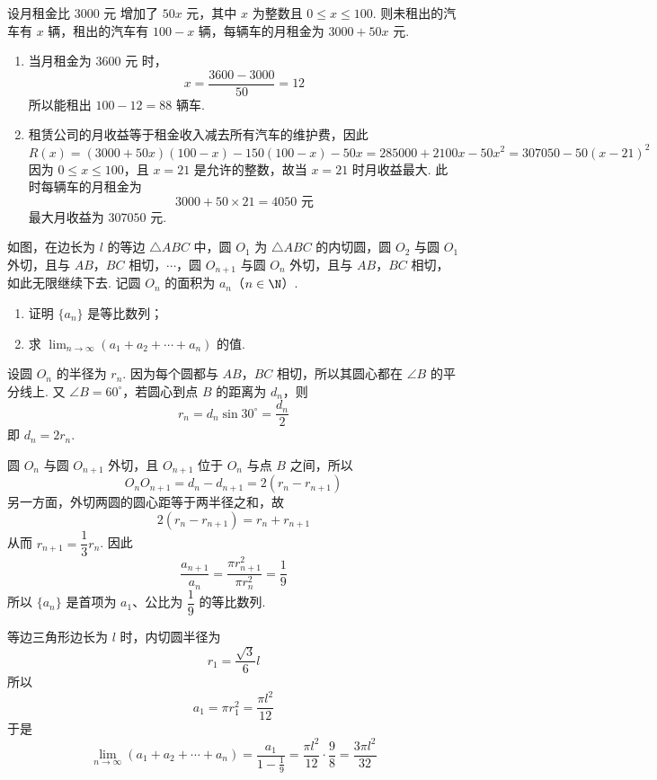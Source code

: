 \begin{solution}
设月租金比 \(3000\text{ 元}\) 增加了 \(50x\text{ 元}\)，其中 \(x\) 为整数且 \(0\leqslant x\leqslant100\). 则未租出的汽车有 \(x\) 辆，租出的汽车有 \(100-x\) 辆，每辆车的月租金为 \(3000+50x\text{ 元}\).

\begin{enumerate}
\item 当月租金为 \(3600\text{ 元}\) 时，
\[
x=\dfrac{3600-3000}{50}=12
\]
所以能租出 \(100-12=88\) 辆车.

\item 租赁公司的月收益等于租金收入减去所有汽车的维护费，因此
\[
R(x)=(3000+50x)(100-x)-150(100-x)-50x
=285000+2100x-50x^2
=307050-50(x-21)^2
\]
因为 \(0\leqslant x\leqslant100\)，且 \(x=21\) 是允许的整数，故当 \(x=21\) 时月收益最大. 此时每辆车的月租金为
\[
3000+50\times21=4050\text{ 元}
\]
最大月收益为 \(307050\text{ 元}\).
\end{enumerate}
\end{solution}

\begin{problem}
如图，在边长为 \(l\) 的等边 \(\triangle ABC\) 中，圆 \(O_{1}\) 为 \(\triangle ABC\) 的内切圆，圆 \(O_{2}\) 与圆 \(O_{1}\) 外切，且与 \(AB\)，\(BC\) 相切，\(\cdots\)，圆 \(O_{n+1}\) 与圆 \(O_{n}\) 外切，且与 \(AB\)，\(BC\) 相切，如此无限继续下去. 记圆 \(O_{n}\) 的面积为 \(a_{n}\)（\(n\in\N\)）.

\begin{enumerate}
\item 证明 \(\{a_{n}\}\) 是等比数列；
\item 求 \(\displaystyle\lim_{n\to\infty}(a_{1}+a_{2}+\cdots+a_{n})\) 的值.
\end{enumerate}

\end{problem}

\begin{solution}
设圆 \(O_n\) 的半径为 \(r_n\). 因为每个圆都与 \(AB\)，\(BC\) 相切，所以其圆心都在 \(\angle B\) 的平分线上. 又 \(\angle B=60^{\circ}\)，若圆心到点 \(B\) 的距离为 \(d_n\)，则
\[
r_n=d_n\sin30^{\circ}=\dfrac{d_n}{2}
\]
即 \(d_n=2r_n\).

圆 \(O_n\) 与圆 \(O_{n+1}\) 外切，且 \(O_{n+1}\) 位于 \(O_n\) 与点 \(B\) 之间，所以
\[
O_nO_{n+1}=d_n-d_{n+1}=2(r_n-r_{n+1})
\]
另一方面，外切两圆的圆心距等于两半径之和，故
\[
2(r_n-r_{n+1})=r_n+r_{n+1}
\]
从而 \(r_{n+1}=\dfrac13r_n\). 因此
\[
\dfrac{a_{n+1}}{a_n}=\dfrac{\pi r_{n+1}^2}{\pi r_n^2}=\dfrac19
\]
所以 \(\{a_n\}\) 是首项为 \(a_1\)、公比为 \(\dfrac19\) 的等比数列.

等边三角形边长为 \(l\) 时，内切圆半径为
\[
r_1=\dfrac{\sqrt3}{6}l
\]
所以
\[
a_1=\pi r_1^2=\dfrac{\pi l^2}{12}
\]
于是
\[
\lim_{n\to\infty}(a_1+a_2+\cdots+a_n)
=\dfrac{a_1}{1-\frac19}
=\dfrac{\pi l^2}{12}\cdot\dfrac98
=\dfrac{3\pi l^2}{32}
\]
\end{solution}

